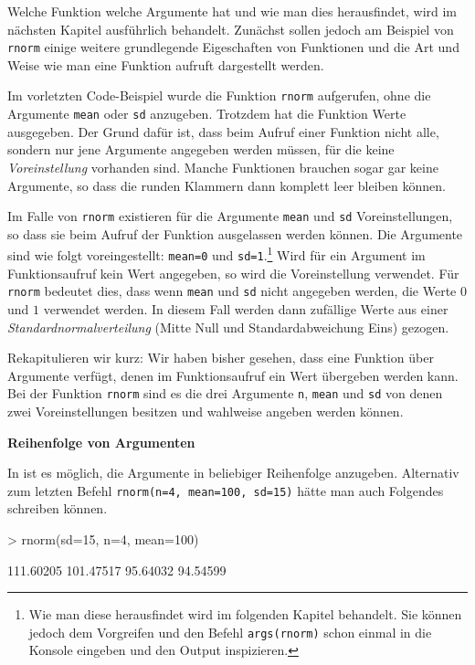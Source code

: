 Welche Funktion welche Argumente hat und wie man dies herausfindet, wird im nächsten Kapitel ausführlich behandelt. Zunächst sollen jedoch am Beispiel von \texttt{rnorm} einige weitere grundlegende Eigeschaften von Funktionen und die Art und Weise wie man eine Funktion aufruft dargestellt werden. 

Im vorletzten Code-Beispiel wurde die Funktion \texttt{rnorm} aufgerufen, ohne die Argumente \texttt{mean} oder \texttt{sd} anzugeben. Trotzdem hat die Funktion Werte ausgegeben. Der Grund dafür ist, dass beim Aufruf einer Funktion nicht alle, sondern nur jene Argumente angegeben werden müssen, für die keine \emph{Voreinstellung} vorhanden sind. Manche Funktionen brauchen sogar gar keine Argumente, so dass die runden Klammern dann komplett leer bleiben können.

Im Falle von \texttt{rnorm} existieren für die Argumente \texttt{mean} und \texttt{sd} Voreinstellungen, so dass sie beim Aufruf der Funktion ausgelassen werden können. Die Argumente sind wie folgt voreingestellt: \verb!mean=0! und \verb!sd=1!.\footnote{Wie man diese herausfindet wird im folgenden Kapitel behandelt. Sie können jedoch dem Vorgreifen und den Befehl \texttt{args(rnorm)} schon einmal in die Konsole eingeben und den Output inspizieren.} Wird für ein Argument im Funktionsaufruf kein Wert angegeben, so wird die Voreinstellung verwendet. Für \texttt{rnorm} bedeutet dies, dass wenn \texttt{mean} und \texttt{sd} nicht angegeben werden, die Werte $0$ und $1$ verwendet werden. In diesem Fall werden dann zufällige Werte aus einer \emph{Standardnormalverteilung} (Mitte Null und Standardabweichung Eins) gezogen. 

Rekapitulieren wir kurz: Wir haben bisher gesehen, dass eine Funktion über Argumente verfügt, denen im Funktionsaufruf ein Wert übergeben werden kann. Bei der Funktion \texttt{rnorm} sind es die drei Argumente \texttt{n}, \texttt{mean} und \texttt{sd} von denen zwei Voreinstellungen besitzen und wahlweise angeben werden können.

\vspace*{5mm}
\textbf{Reihenfolge von Argumenten}

In \R{} ist es möglich, die Argumente in beliebiger Reihenfolge anzugeben. Alternativ zum letzten Befehl \texttt{rnorm(n=4, mean=100, sd=15)} hätte man auch Folgendes schreiben können. 

\begin{Schunk}
\begin{Sinput}
> rnorm(sd=15, n=4, mean=100)
\end{Sinput}
\begin{Soutput}
[1] 111.60205 101.47517  95.64032  94.54599
\end{Soutput}
\end{Schunk}


